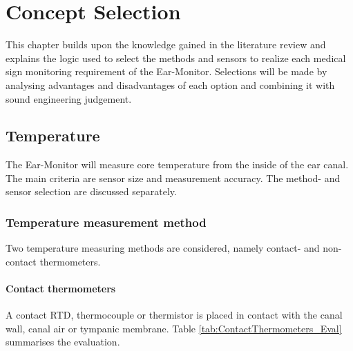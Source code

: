 \chapter{Concept Selection}
\label{chp:Concept Selection}
This chapter builds upon the knowledge gained in the literature review and explains the logic used to select the methods and sensors to realize each medical sign monitoring requirement of the Ear-Monitor. Selections will be made by analysing advantages and disadvantages of each option and combining it with sound engineering judgement.

\section{Temperature}
The Ear-Monitor will measure core temperature from the inside of the ear canal. The main criteria are sensor size and measurement accuracy. The method- and sensor selection are discussed separately.

\subsection{Temperature measurement method}
Two temperature measuring methods are considered, namely contact- and non-contact thermometers.

\subsubsection{Contact thermometers}
A contact RTD, thermocouple or thermistor is placed in contact with the canal wall, canal air or tympanic membrane. Table \ref{tab:ContactThermometers_Eval} summarises the evaluation.

